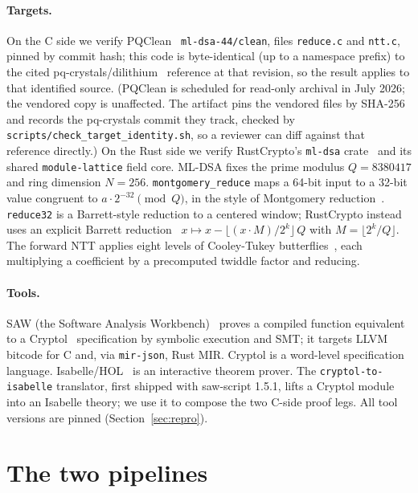 \documentclass[11pt]{article}
\newcommand{\code}[1]{\texttt{#1}}
\begin{document}
\paragraph{Targets.} On the C side we verify PQClean~\cite{pqclean} \code{ml-dsa-44/clean}, files
\code{reduce.c} and \code{ntt.c}, pinned by commit hash; this code is byte-identical (up to a namespace
prefix) to the cited pq-crystals/dilithium~\cite{dilithiumref} reference at that revision, so the result
applies to that identified source. (PQClean is scheduled for read-only archival in July 2026; the
vendored copy is unaffected. The artifact pins the vendored files by SHA-256 and records the
pq-crystals commit they track, checked by \code{scripts/check\_target\_identity.sh}, so a reviewer can
diff against that reference directly.) On the Rust side we verify
RustCrypto's \code{ml-dsa} crate~\cite{rustcrypto} and its shared \code{module-lattice} field core. ML-DSA
fixes the prime modulus $Q = 8380417$ and ring dimension $N = 256$. \code{montgomery\_reduce} maps a
64-bit input to a 32-bit value congruent to $a \cdot 2^{-32} \pmod Q$, in the style of Montgomery
reduction~\cite{montgomery}. \code{reduce32} is a Barrett-style reduction to a centered window;
RustCrypto instead uses an explicit Barrett reduction~\cite{barrett}
$x \mapsto x - \lfloor (x \cdot M) / 2^{k} \rfloor\, Q$ with $M = \lfloor 2^{k}/Q \rfloor$. The forward
NTT applies eight levels of Cooley-Tukey butterflies~\cite{cooleytukey}, each multiplying a coefficient
by a precomputed twiddle factor and reducing.

\paragraph{Tools.} SAW (the Software Analysis Workbench)~\cite{saw} proves a compiled function
equivalent to a Cryptol~\cite{cryptol} specification by symbolic execution and SMT; it targets LLVM
bitcode for C and, via \code{mir-json}, Rust MIR. Cryptol is a word-level specification language.
Isabelle/HOL~\cite{isabelle} is an interactive theorem prover. The \code{cryptol-to-isabelle} translator, first shipped with saw-script
1.5.1, lifts a Cryptol module into an Isabelle theory; we use it to compose the two C-side proof legs.
All tool versions are pinned (Section~\ref{sec:repro}).

\section{The two pipelines}\label{sec:pipeline}
\end{document}
